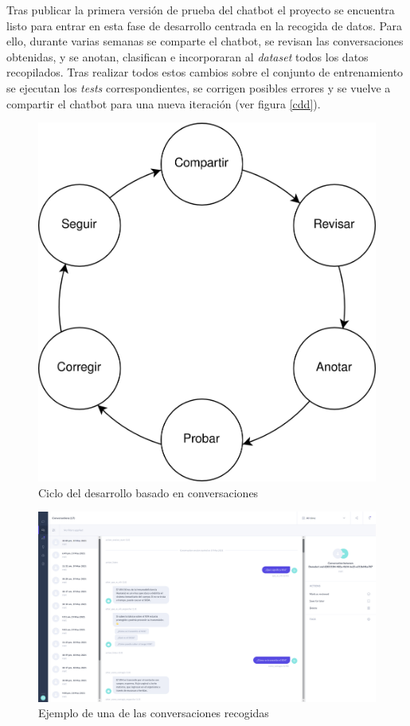 Tras publicar la primera versión de prueba del chatbot el proyecto se encuentra listo para entrar en esta fase de desarrollo centrada en la recogida de datos. Para ello, durante varias semanas se comparte el chatbot, se revisan las conversaciones obtenidas, y se anotan, clasifican e incorporaran al \textit{dataset} todos los datos recopilados. Tras realizar todos estos cambios sobre el conjunto de entrenamiento se ejecutan los \textit{tests} correspondientes, se corrigen posibles errores y se vuelve a compartir el chatbot para una nueva iteración (ver figura \ref{cdd}).\\

\begin{figure}[htbp]
\centering
\includegraphics[scale=0.15]{../images/cdd.png} 
\caption{Ciclo del desarrollo basado en conversaciones}
\label{fig:cdd}
\end{figure}

\begin{figure}[htbp]
\centering
\includegraphics[scale=0.3]{../images/collected_dialogs.png} 
\caption{Ejemplo de una de las conversaciones recogidas}
\label{fig:collected dialogs}
\end{figure}

